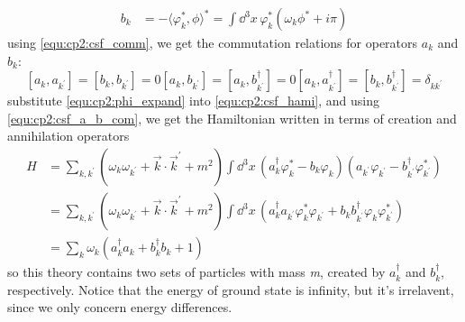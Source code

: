 \begin{enumerate}[label = {(\alph*)}]
\begin{subequations}
\begin{align}
            b_k & = -\langle \varphi^\ast_k, \phi \rangle^\ast = \int \dd^3x \, \varphi^\ast_k \left(\omega_k\phi^\ast + i\pi\right)
        \end{align}
    \end{subequations}
    using \eqref{equ:cp2:csf_comm}, we get the commutation relations for operators $a_k$ and $b_k$:
    \begin{subequations}\label{equ:cp2:csf_a_b_com}
        \begin{equation}
            [a_k,a_{k^\prime}] = [b_k, b_{k^\prime}] = 0
        \end{equation}
        \begin{equation}
            [a_k,b_{k^\prime}] = [a_k, b_{k^\prime}^\dagger] = 0
        \end{equation}
        \begin{equation}
            [a_k, a_{k^\prime}^\dagger] = [b_k, b_{k^\prime}^\dagger] = \delta_{kk^\prime}
        \end{equation}
    \end{subequations}
    substitute \eqref{equ:cp2:phi_expand} into \eqref{equ:cp2:csf_hami}, and using \eqref{equ:cp2:csf_a_b_com}, we get the 
    Hamiltonian written in terms of creation and annihilation operators
    \begin{align}\label{equ:cp2:csf_hami_diag}
        H & = \sum_{k, k^\prime}\left(\omega_k\omega_{k^\prime} + \vec{k}\cdot\vec{k}^\prime + m^2\right)
        \int \dd^3x \, \left(a^\dagger_k\varphi^\ast_k - b_k\varphi_k\right)
        \left(a_{k^\prime}\varphi_{k^\prime} - b^\dagger_{k^\prime}\varphi^\ast_{k^\prime}\right)\nonumber\\
        & = \sum_{k, k^\prime}\left(\omega_k\omega_{k^\prime} + \vec{k}\cdot\vec{k}^\prime + m^2\right)
        \int \dd^3x \, \left(a^\dagger_k a_{k^\prime} \varphi^\ast_k \varphi_{k^\prime} + b_k b^\dagger_{k^\prime} \varphi_k \varphi^\ast_{k^\prime}\right)\nonumber\\
        & = \sum_k \omega_k \left(a^\dagger_k a_k + b^\dagger_k b_k + 1\right)
    \end{align}
    so this theory contains two sets of particles with mass \textit{m}, created by $a^\dagger_k$ and $b^\dagger_k$, respectively.
    Notice that the energy of ground state is infinity, but it's irrelavent, since we only concern energy differences.


\end{enumerate}
